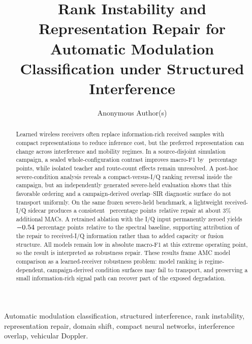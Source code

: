 \documentclass[letterpaper,journal]{IEEEtran}
\title{Rank Instability and Representation Repair for Automatic Modulation
Classification under Structured Interference}
\author{Anonymous Author(s)}
\newcommand{\pp}{percentage points}
\begin{document}
\maketitle

\begin{abstract}
Learned wireless receivers often replace information-rich received samples
with compact representations to reduce inference cost, but the preferred
representation can change across interference and mobility regimes. In a source-disjoint
simulation campaign, a sealed whole-configuration contrast improves macro-F1
by \MethodEffectDiff\ \pp, while isolated teacher and route-count effects
remain unresolved. A post-hoc severe-condition analysis reveals a
compact-versus-I/Q ranking reversal inside the campaign, but an independently
generated severe-held evaluation shows that this favorable ordering and a
campaign-derived overlap--SIR diagnostic surface do not transport uniformly.
On the same frozen severe-held benchmark, a lightweight received-I/Q sidecar
produces a consistent \SevereRepairDiff\ \pp\ relative repair at about 3\%
additional MACs. A retrained ablation with the I/Q input
permanently zeroed yields $-0.54$ \pp\ relative to the
spectral baseline, supporting attribution of the repair to received-I/Q
information rather than to added capacity or fusion structure. All models
remain low in absolute macro-F1 at this extreme operating point, so the result
is interpreted as robustness repair. These
results frame AMC model comparison as a learned-receiver robustness problem:
model ranking is regime-dependent, campaign-derived condition surfaces may
fail to transport, and preserving a small information-rich signal path can
recover part of the exposed degradation.
\end{abstract}

\begin{IEEEkeywords}
Automatic modulation classification, structured interference, rank
instability, representation repair, domain shift, compact neural networks,
interference overlap, vehicular Doppler.
\end{IEEEkeywords}

\begin{center}
\end{center}
\end{document}

